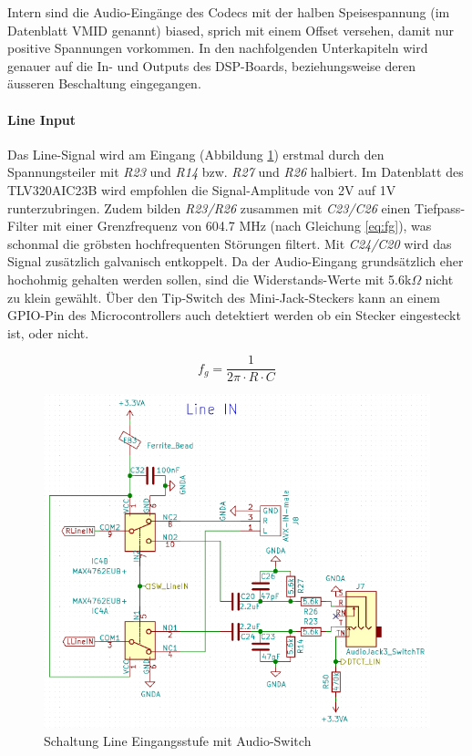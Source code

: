 Intern sind die Audio-Eingänge des Codecs mit der halben Speisespannung (im Datenblatt VMID genannt) biased, sprich mit einem Offset versehen, damit nur positive Spannungen vorkommen.
In den nachfolgenden Unterkapiteln wird genauer auf die In- und Outputs des DSP-Boards, beziehungsweise deren äusseren Beschaltung eingegangen.


\paragraph{Line Input}
\label{par:LineIN}
Das Line-Signal wird am Eingang (Abbildung \ref{fig:Schema_LineIN}) erstmal durch den Spannungsteiler mit \textit{R23} und \textit{R14} bzw. \textit{R27} und \textit{R26} halbiert. Im Datenblatt des TLV320AIC23B \cite{tlv320} wird empfohlen die Signal-Amplitude von 2V auf 1V runterzubringen. Zudem bilden \textit{R23/R26} zusammen mit \textit{C23/C26}  einen Tiefpass-Filter mit einer Grenzfrequenz von 604.7 MHz (nach Gleichung \ref{eq:fg}), was schonmal die gröbsten hochfrequenten Störungen filtert. Mit \textit{C24/C20} wird das Signal zusätzlich galvanisch entkoppelt. Da der Audio-Eingang grundsätzlich eher hochohmig gehalten werden sollen, sind die Widerstands-Werte mit 5.6k$\Omega$ nicht zu klein gewählt. \cite{book:douglas}
Über den Tip-Switch des Mini-Jack-Steckers kann an einem GPIO-Pin des Microcontrollers auch detektiert werden ob ein Stecker eingesteckt ist, oder nicht.

\begin{equation}
f_g=\frac{1}{2\pi \cdot R \cdot C}
\label{eq:fg}
\end{equation}

\begin{figure} [H]
\begin{center}
 \includegraphics[scale=0.5]{../graphics/Schema_LineIN.png}
\caption{Schaltung Line Eingangsstufe mit Audio-Switch}
\label{fig:Schema_LineIN}
\end{center}
\end{figure}

